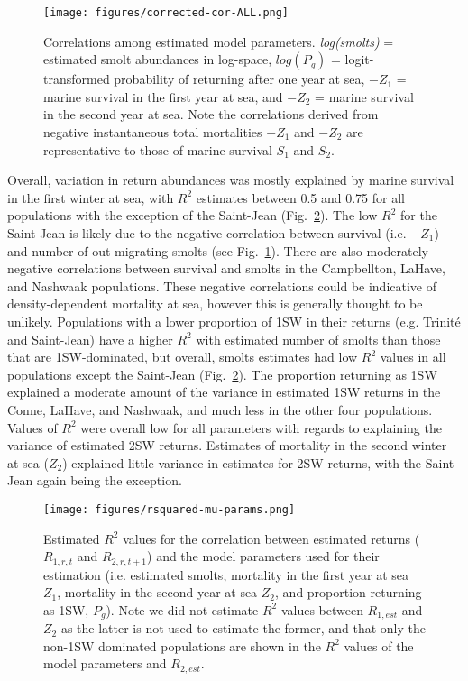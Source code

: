 \documentclass[12pt]{article}
\newcommand{\Pg}{$P_g$\xspace}
\begin{document}
\begin{figure}[htbp] \centering
    \texttt{[image: figures/corrected-cor-ALL.png]}
    \caption{Correlations among estimated model parameters. \emph{log(smolts)} = estimated smolt abundances in log-space, $log(P_g)$ = logit-transformed probability of
        returning after one year at sea, $-Z_1$ = marine survival in the first year at sea, and $-Z_2$ = marine survival in the second year at sea.
        Note the correlations derived from negative instantaneous total mortalities $-Z_1$ and $-Z_2$ are representative to those of marine survival $S_1$ and $S_2$.}
    \label{fig:cor-params} 
\end{figure}

Overall, variation in return abundances was mostly explained by marine survival in the
first winter at sea, with $R^2$ estimates between 0.5 and 0.75 for all populations
with the exception of the Saint-Jean (Fig.~\ref{fig:mu-rsq}).
The low $R^2$ for the Saint-Jean is likely due to the negative correlation
between survival (i.e. $-Z_1$) and number of out-migrating smolts (see Fig.~\ref{fig:cor-params}). 
There are also moderately negative correlations between survival and smolts in
the Campbellton, LaHave, and Nashwaak populations.
These negative correlations could be indicative of density-dependent
mortality at sea, however this is generally thought to be unlikely.
Populations with a lower proportion of 1SW in their returns (e.g. Trinit\'{e}
and Saint-Jean) have a higher $R^2$ with estimated number of smolts than those
that are 1SW-dominated, but overall, smolts estimates had low $R^2$ values in 
all populations except the Saint-Jean (Fig.~\ref{fig:mu-rsq}).
The proportion returning as 1SW explained a moderate amount of the variance in
estimated 1SW returns in the Conne, LaHave, and Nashwaak, and much less in the
other four populations.
Values of $R^2$ were overall low for all parameters with regards to explaining
the variance of estimated 2SW returns. Estimates of mortality in the second winter at sea ($Z_2$)
explained little variance in estimates for 2SW returns, with the Saint-Jean again being the
exception.

\begin{figure}[htbp] \centering
    \texttt{[image: figures/rsquared-mu-params.png]}
    \caption{Estimated $R^2$ values for the correlation between estimated
        returns ($R_{1,r,t}$ and $R_{2,r,t+1}$) and the model parameters used
        for their estimation (i.e. estimated smolts, mortality in the first
        year at sea $Z_1$, mortality in the second year at sea $Z_2$, and
        proportion returning as 1SW, \Pg). Note we did not estimate $R^2$
        values between $R_{1,est}$ and $Z_2$ as the latter is not used to
        estimate the former, and that only the non-1SW dominated populations are
        shown in the $R^2$ values of the model parameters and $R_{2,est}$.}
    \label{fig:mu-rsq} 
\end{figure}
\end{document}
